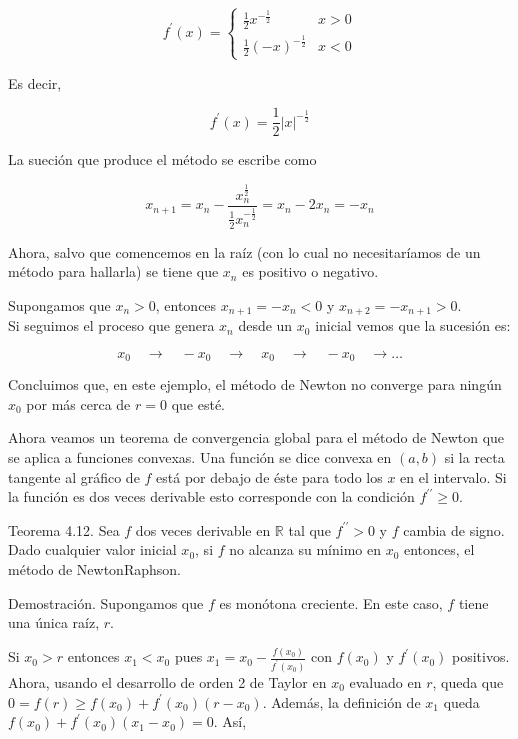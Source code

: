 \documentclass[10pt]{article}
\begin{document}
$$
f^{\prime}(x)= \begin{cases}\frac{1}{2} x^{-\frac{1}{2}} & x>0 \\ \frac{1}{2}(-x)^{-\frac{1}{2}} & x<0\end{cases}
$$

Es decir,

$$
f^{\prime}(x)=\frac{1}{2}|x|^{-\frac{1}{2}}
$$

La sueción que produce el método se escribe como

$$
x_{n+1}=x_{n}-\frac{x_{n}^{\frac{1}{2}}}{\frac{1}{2} x_{n}^{-\frac{1}{2}}}=x_{n}-2 x_{n}=-x_{n}
$$

Ahora, salvo que comencemos en la raíz (con lo cual no necesitaríamos de un método para hallarla) se tiene que $x_{n}$ es positivo o negativo.

Supongamos que $x_{n}>0$, entonces $x_{n+1}=-x_{n}<0$ y $x_{n+2}=-x_{n+1}>0$.\\
Si seguimos el proceso que genera $x_{n}$ desde un $x_{0}$ inicial vemos que la sucesión es:

$$
x_{0} \quad \rightarrow \quad-x_{0} \quad \rightarrow \quad x_{0} \quad \rightarrow \quad-x_{0} \quad \rightarrow \ldots
$$

Concluimos que, en este ejemplo, el método de Newton no converge para ningún $x_{0}$ por más cerca de $r=0$ que esté.

Ahora veamos un teorema de convergencia global para el método de Newton que se aplica a funciones convexas. Una función se dice convexa en $(a, b)$ si la recta tangente al gráfico de $f$ está por debajo de éste para todo los $x$ en el intervalo. Si la función es dos veces derivable esto corresponde con la condición $f^{\prime \prime} \geq 0$.

Teorema 4.12. Sea $f$ dos veces derivable en $\mathbb{R}$ tal que $f^{\prime \prime}>0$ y $f$ cambia de signo. Dado cualquier valor inicial $x_{0}$, si $f$ no alcanza su mínimo en $x_{0}$ entonces, el método de NewtonRaphson.

Demostración. Supongamos que $f$ es monótona creciente. En este caso, $f$ tiene una única raíz, $r$.

Si $x_{0}>r$ entonces $x_{1}<x_{0}$ pues $x_{1}=x_{0}-\frac{f\left(x_{0}\right)}{f^{\prime}\left(x_{0}\right)}$ con $f\left(x_{0}\right)$ y $f^{\prime}\left(x_{0}\right)$ positivos. Ahora, usando el desarrollo de orden 2 de Taylor en $x_{0}$ evaluado en $r$, queda que $0=f(r) \geq f\left(x_{0}\right)+f^{\prime}\left(x_{0}\right)\left(r-x_{0}\right)$. Además, la definición de $x_{1}$ queda $f\left(x_{0}\right)+f^{\prime}\left(x_{0}\right)\left(x_{1}-x_{0}\right)=0$. Así,
\end{document}
